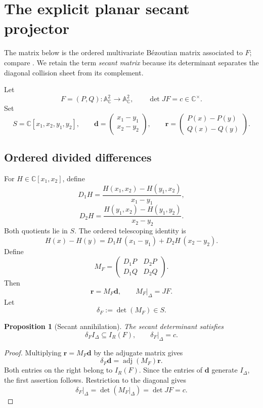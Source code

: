 \documentclass[11pt]{article}
\newtheorem{proposition}[theorem]{Proposition}
\newcommand{\A}{\mathbb A}
\newcommand{\C}{\mathbb C}
\begin{document}
\section{The explicit planar secant projector}
\label{sec:secant-projector}

The matrix below is the ordered multivariate B\'ezoutian matrix associated
to \(F\); compare \cite{McKean2023Bezoutians,SchejaStorch1975}.  We retain
the term \emph{secant matrix} because its determinant separates the
diagonal collision sheet from its complement.

Let
\[
  F=(P,Q)\colon\A^2_{\C}\longrightarrow\A^2_{\C},
  \qquad
  \det JF=c\in\C^\times.
\]
Set
\[
  S=\C[x_1,x_2,y_1,y_2],\qquad
  \mathbf d=
  \begin{pmatrix}x_1-y_1\\x_2-y_2\end{pmatrix},\qquad
  \mathbf r=
  \begin{pmatrix}P(x)-P(y)\\Q(x)-Q(y)\end{pmatrix}.
\]

\subsection{Ordered divided differences}

For \(H\in\C[x_1,x_2]\), define
\[
  D_1H
  =
  \frac{H(x_1,x_2)-H(y_1,x_2)}{x_1-y_1},
\]
\[
  D_2H
  =
  \frac{H(y_1,x_2)-H(y_1,y_2)}{x_2-y_2}.
\]
Both quotients lie in \(S\).  The ordered telescoping identity is
\[
  H(x)-H(y)
  =D_1H\,(x_1-y_1)+D_2H\,(x_2-y_2).
\]
Define
\[
  M_F=
  \begin{pmatrix}
    D_1P&D_2P\\
    D_1Q&D_2Q
  \end{pmatrix}.
\]
Then
\[
  \mathbf r=M_F\mathbf d,\qquad
  M_F\big|_\Delta=JF.
\]
Let
\[
  \delta_F:=\det(M_F)\in S.
\]

\begin{proposition}[Secant annihilation]
\label{prop:secant-annihilation}
The secant determinant satisfies
\[
  \delta_FI_\Delta\subseteq I_R(F),
  \qquad
  \delta_F\big|_\Delta=c.
\]
\end{proposition}

\begin{proof}
Multiplying \(\mathbf r=M_F\mathbf d\) by the adjugate matrix gives
\[
  \delta_F\mathbf d=\operatorname{adj}(M_F)\mathbf r.
\]
Both entries on the right belong to \(I_R(F)\).  Since the entries of
\(\mathbf d\) generate \(I_\Delta\), the first assertion follows.
Restriction to the diagonal gives
\[
  \delta_F\big|_\Delta
  =\det(M_F|_\Delta)
  =\det JF
  =c.
\]
\end{proof}
\end{document}
